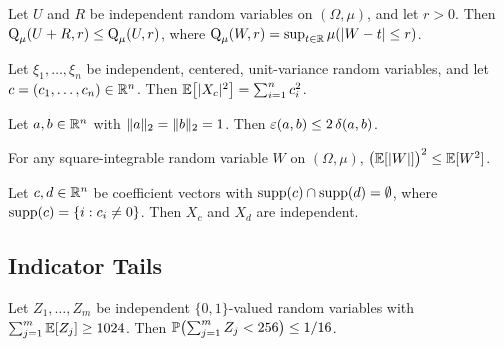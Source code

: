 \begin{theorem}%
\label{thm:concFn-add-app}
Let $U$ and $R$ be independent random variables on $(\Omega, \mu)$, and let
$r > 0$. Then
$\operatorname{Q}_\mu(U + R, r) \le \operatorname{Q}_\mu(U, r)$,
where $\operatorname{Q}_\mu(W, r) = \sup_{t \in \mathbb{R}} \mu(\lvert W - t \rvert \le r)$.
\end{theorem}

\begin{theorem}%
\label{thm:L2-finLinComb-app}
Let $\xi_1, \dots, \xi_n$ be independent, centered, unit-variance random
variables, and let $c = (c_1, \dots, c_n) \in \mathbb{R}^n$. Then
$\mathbb{E}\bigl[\lvert X_c \rvert^2\bigr] = \sum_{i=1}^n c_i^2$.
\end{theorem}

\begin{theorem}\label{thm:eps-le-modulus-app}
Let $a, b \in \mathbb{R}^n$ with $\lVert a \rVert_2 = \lVert b \rVert_2 = 1$. Then
$\varepsilon(a,b) \le 2 \, \delta(a,b)$.
\end{theorem}

\begin{theorem}\label{thm:jensen-app}
For any square-integrable random variable $W$ on $(\Omega, \mu)$,
$\bigl(\mathbb{E}[\lvert W \rvert]\bigr)^2 \le \mathbb{E}[W^2]$.
\end{theorem}

\begin{theorem}%
\label{thm:indep-disjoint-app}
Let $c, d \in \mathbb{R}^n$ be coefficient vectors with
$\operatorname{supp}(c) \cap \operatorname{supp}(d) = \emptyset$, where
$\operatorname{supp}(c) = \{i : c_i \ne 0\}$. Then $X_c$ and $X_d$ are independent.
\end{theorem}

\subsection{Indicator Tails}

\begin{theorem}\label{thm:chebyshev-indicator-app}
Let $Z_1, \dots, Z_m$ be independent $\{0,1\}$-valued random variables with
$\sum_{j=1}^m \mathbb{E}[Z_j] \ge 1024$.
Then $\mathbb{P}\bigl(\sum_{j=1}^m Z_j < 256\bigr) \le 1/16$.
\end{theorem}

